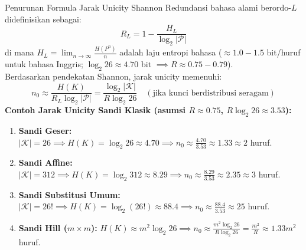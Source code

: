 \documentclass[11pt,a4paper]{article}
\begin{document}
\begin{rumusbox}{Penurunan Formula Jarak Unicity Shannon}
Redundansi bahasa alami berordo-$L$ didefinisikan sebagai:
\[
R_L = 1 - \frac{H_L}{\log_2 |\mathcal{P}|}
\]
di mana $H_L = \lim_{n \to \infty} \frac{H(P^n)}{n}$ adalah laju entropi bahasa ($\approx 1.0 - 1.5$ bit/huruf untuk bahasa Inggris; $\log_2 26 \approx 4.70$ bit $\implies R \approx 0.75 - 0.79$).\\
Berdasarkan pendekatan Shannon, jarak unicity memenuhi:
\[
n_0 \approx \frac{H(K)}{R_L \log_2 |\mathcal{P}|} = \frac{\log_2 |\mathcal{K}|}{R \log_2 26} \quad (\text{jika kunci berdistribusi seragam})
\]
\textbf{Contoh Jarak Unicity Sandi Klasik (asumsi $R \approx 0.75$, $R \log_2 26 \approx 3.53$):}
\begin{enumerate}
    \item \textbf{Sandi Geser:} $|\mathcal{K}| = 26 \implies H(K) = \log_2 26 \approx 4.70 \implies n_0 \approx \frac{4.70}{3.53} \approx 1.33 \approx 2$ huruf.
    \item \textbf{Sandi Affine:} $|\mathcal{K}| = 312 \implies H(K) = \log_2 312 \approx 8.29 \implies n_0 \approx \frac{8.29}{3.53} \approx 2.35 \approx 3$ huruf.
    \item \textbf{Sandi Substitusi Umum:} $|\mathcal{K}| = 26! \implies H(K) = \log_2(26!) \approx 88.4 \implies n_0 \approx \frac{88.4}{3.53} \approx 25$ huruf.
    \item \textbf{Sandi Hill ($m \times m$):} $H(K) \approx m^2 \log_2 26 \implies n_0 \approx \frac{m^2 \log_2 26}{R \log_2 26} = \frac{m^2}{R} \approx 1.33 m^2$ huruf.
\end{enumerate}
\end{rumusbox}
\end{document}
